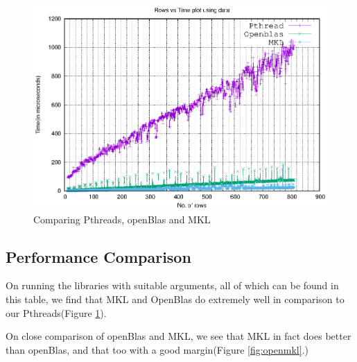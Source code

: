 \documentclass[a4paper]{article}
\begin{document}
\begin{figure}[h]
    \centering
    \includegraphics{All_comparision_without_error_bars.eps}
    \caption{Comparing Pthreads, openBlas and MKL}
    \label{fig:all}
\end{figure}

\subsection{Performance Comparison}
On running the libraries with suitable arguments, all of which can be found in this table, we find that MKL and OpenBlas do extremely well in comparison to our Pthreads(Figure \ref{fig:all}).


On close comparison of openBlas and MKL, we see that MKL in fact does better than openBlas, and that too with a good margin(Figure \ref{fig:openmkl}.)
\end{document}
